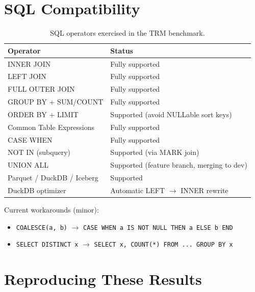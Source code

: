 \documentclass[11pt,a4paper]{article}
\begin{document}
\section{SQL Compatibility}

\begin{table}[H]
\centering
\small
\begin{tabular}{@{}ll@{}}
\toprule
\textbf{Operator} & \textbf{Status} \\
\midrule
INNER JOIN           & Fully supported \\
LEFT JOIN            & Fully supported \\
FULL OUTER JOIN      & Fully supported \\
GROUP BY + SUM/COUNT & Fully supported \\
ORDER BY + LIMIT     & Supported (avoid NULLable sort keys) \\
Common Table Expressions & Fully supported \\
CASE WHEN            & Fully supported \\
NOT IN (subquery)    & Supported (via MARK join) \\
UNION ALL            & Supported (feature branch, merging to dev) \\
Parquet / DuckDB / Iceberg & Supported \\
DuckDB optimizer     & Automatic LEFT $\to$ INNER rewrite \\
\bottomrule
\end{tabular}
\caption{SQL operators exercised in the TRM benchmark.}
\end{table}

\noindent Current workarounds (minor):
\begin{itemize}[nosep]
    \item \texttt{COALESCE(a, b)} $\to$ \texttt{CASE WHEN a IS NOT NULL THEN a ELSE b END}
    \item \texttt{SELECT DISTINCT x} $\to$ \texttt{SELECT x, COUNT(*) FROM ... GROUP BY x}
\end{itemize}

\section{Reproducing These Results}
\end{document}
